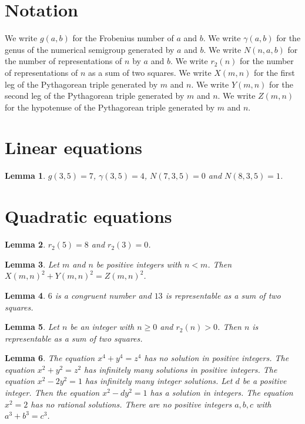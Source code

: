 \documentclass{article}
\newtheorem{lemma}{Lemma}
\begin{document}
\section{Notation}

We write $g(a,b)$ for the Frobenius number of $a$ and $b$.
We write $\gamma(a,b)$ for the genus of the numerical semigroup generated by $a$ and $b$.
We write $N(n,a,b)$ for the number of representations of $n$ by $a$ and $b$.
We write $r_2(n)$ for the number of representations of $n$ as a sum of two squares.
We write $X(m,n)$ for the first leg of the Pythagorean triple generated by $m$ and $n$.
We write $Y(m,n)$ for the second leg of the Pythagorean triple generated by $m$ and $n$.
We write $Z(m,n)$ for the hypotenuse of the Pythagorean triple generated by $m$ and $n$.

\section{Linear equations}

\begin{lemma}\label{sylvester}
$g(3,5)=7$, $\gamma(3,5)=4$, $N(7,3,5)=0$ and $N(8,3,5)=1$.
\end{lemma}

\section{Quadratic equations}

\begin{lemma}\label{squares}
$r_2(5)=8$ and $r_2(3)=0$.
\end{lemma}

\begin{lemma}\label{euclid}
Let $m$ and $n$ be positive integers with $n<m$. Then $X(m,n)^2+Y(m,n)^2=Z(m,n)^2$.
\end{lemma}

\begin{lemma}\label{congruent}
$6$ is a congruent number and $13$ is representable as a sum of two squares.
\end{lemma}

\begin{lemma}\label{representable}
Let $n$ be an integer with $n\ge0$ and $r_2(n)>0$. Then $n$ is representable as a sum of two squares.
\end{lemma}

\begin{lemma}\label{solutions}
The equation $x^4+y^4=z^4$ has no solution in positive integers. The equation $x^2+y^2=z^2$ has infinitely many solutions in positive integers. The equation $x^2-2y^2=1$ has infinitely many integer solutions. Let $d$ be a positive integer. Then the equation $x^2-dy^2=1$ has a solution in integers. The equation $x^2=2$ has no rational solutions. There are no positive integers $a,b,c$ with $a^3+b^3=c^3$.
\end{lemma}
\end{document}
